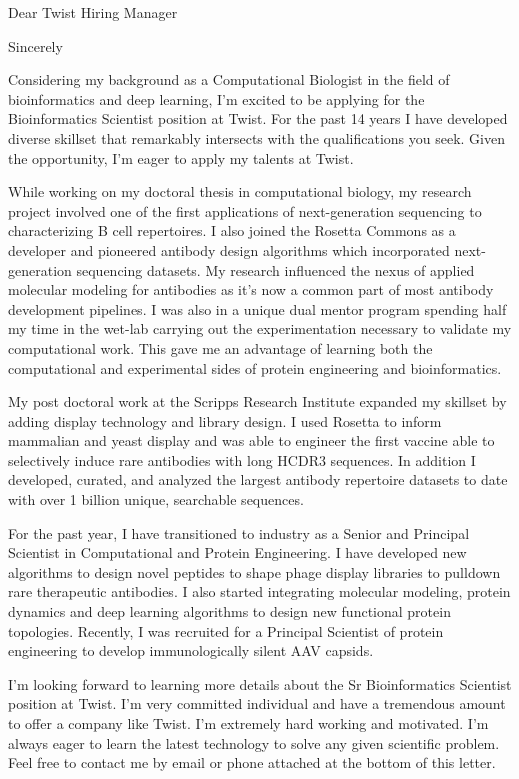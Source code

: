 \documentclass[11pt,a4paper,sans]{moderncv}        %
\title{}                               %
\begin{document}
\date{2020}
\opening{Dear Twist Hiring Manager}
\closing{Sincerely}
\makelettertitle


Considering my background as a Computational Biologist in the field of bioinformatics and deep learning, I'm excited to be applying for the
Bioinformatics Scientist position at Twist. 
For the past 14 years I have developed diverse skillset that remarkably intersects with the qualifications you seek. Given the opportunity, 
I'm eager to apply my talents at Twist.

\vspace{0.1in}
While working on my doctoral thesis in computational biology, my research project involved one of the first applications of next-generation 
sequencing to characterizing B cell repertoires. 
I also joined the Rosetta Commons as a developer and pioneered antibody design algorithms which incorporated next-generation sequencing datasets. My research influenced the nexus of applied molecular modeling for antibodies as it's now a common part of most antibody development pipelines. I was also in a unique dual 
mentor program spending half my time in the wet-lab carrying out the experimentation necessary to validate my computational work. This gave me an advantage 
of learning both the computational and experimental sides of protein engineering and bioinformatics.

\vspace{0.1in}
My post doctoral work at the Scripps Research Institute expanded my skillset by adding display technology and library design. I used Rosetta to inform 
mammalian and yeast 
display and was able to engineer the first vaccine able to selectively induce rare antibodies with long HCDR3 sequences.  In addition I developed, curated, and analyzed the largest antibody 
repertoire datasets to date with over 1 billion unique, searchable sequences.

For the past year, I have transitioned to industry as a 
Senior and Principal Scientist in Computational and Protein Engineering. I have developed new algorithms to design novel peptides to shape phage display libraries to pulldown rare therapeutic antibodies.
I also started integrating molecular modeling, protein dynamics and deep learning algorithms to design new functional protein topologies. Recently, I was recruited for a Principal Scientist of protein engineering to develop immunologically silent AAV capsids. 


\vspace{0.1in}
I'm looking forward to learning more details about the Sr Bioinformatics Scientist position at Twist. I'm very committed individual and have a tremendous amount
 to offer a company like Twist. I'm extremely hard working and motivated. I'm always eager to learn the latest technology to solve any given scientific problem. 
Feel free to contact me by email or phone attached at the bottom of this letter. 

\makeletterclosing
\end{document}
